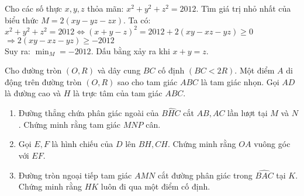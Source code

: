 \begin{ex}%
Cho các số thực $x,y,z$ thỏa mãn: $x^{2}+y^{2}+z^{2}=2012$. Tìm giá trị nhỏ nhất của biểu thức $M=2(xy-yz-zx)$.
\loigiai
    {
Ta có: $x^{2}+y^{2}+z^{2}=2012\Leftrightarrow (x+y-z)^{2}=2012+2(xy-xz-yz)\geq0$\\
$\Rightarrow 2(xy-xz-yz)\geq-2012$\\
Suy ra: $\min_M=-2012$. Dấu bằng xảy ra khi $x+y=z$.
  }
\end{ex}
\begin{ex}%
Cho đường tròn $(O,R)$ và dây cung $BC$ cố định $(BC<2R)$. Một điểm $A$ di động trên đường tròn $(O,R)$ sao cho tam giác $ABC$ là tam giác nhọn. Gọi $AD$ là đường cao và $H$ là trực tâm của tam giác $ABC$.
\begin{enumerate}
\item Đường thẳng chứa phân giác ngoài của $\widehat{BHC}$ cắt $AB,AC$ lần lượt tại $M$ và $N$. Chứng minh rằng  tam giác $MNP$ cân.
\item Gọi $E,F$ là hình chiếu của $D$ lên $BH,CH$. Chứng minh rằng $OA$ vuông góc với $EF$.
\item Đường tròn ngoại tiếp tam giác $AMN$ cắt đường phân giác trong $\widehat{BAC}$ tại $K$. Chứng minh rằng $HK$ luôn đi qua một điểm cố định.
\end{enumerate}
\loigiai
    {
    \begin{center}
\end{center}

}
\end{ex}
